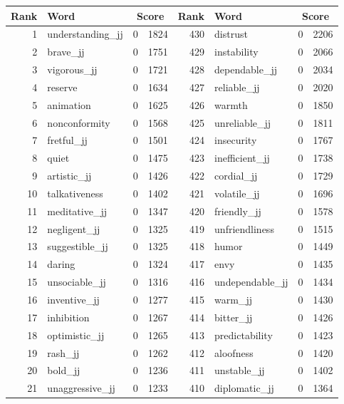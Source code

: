 \begin{table}[tbp]
    \begin{tabular}{| rlr@{.}l | rlr@{.}l |}
    \hline
    \textbf{Rank} & \textbf{Word} & \multicolumn{2}{c|}{\textbf{Score}} & \textbf{Rank} & \textbf{Word} & \multicolumn{2}{c|}{\textbf{Score}} \\
    \hline
    1 & understanding\_jj & 0 & 1824    &    430 & distrust & 0 & 2206 \\
    2 & brave\_jj & 0 & 1751    &    429 & instability & 0 & 2066 \\
    3 & vigorous\_jj & 0 & 1721    &    428 & dependable\_jj & 0 & 2034 \\
    4 & reserve & 0 & 1634    &    427 & reliable\_jj & 0 & 2020 \\
    5 & animation & 0 & 1625    &    426 & warmth & 0 & 1850 \\
    6 & nonconformity & 0 & 1568    &    425 & unreliable\_jj & 0 & 1811 \\
    7 & fretful\_jj & 0 & 1501    &    424 & insecurity & 0 & 1767 \\
    8 & quiet & 0 & 1475    &    423 & inefficient\_jj & 0 & 1738 \\
    9 & artistic\_jj & 0 & 1426    &    422 & cordial\_jj & 0 & 1729 \\
    10 & talkativeness & 0 & 1402    &    421 & volatile\_jj & 0 & 1696 \\
    11 & meditative\_jj & 0 & 1347    &    420 & friendly\_jj & 0 & 1578 \\
    12 & negligent\_jj & 0 & 1325    &    419 & unfriendliness & 0 & 1515 \\
    13 & suggestible\_jj & 0 & 1325    &    418 & humor & 0 & 1449 \\
    14 & daring & 0 & 1324    &    417 & envy & 0 & 1435 \\
    15 & unsociable\_jj & 0 & 1316    &    416 & undependable\_jj & 0 & 1434 \\
    16 & inventive\_jj & 0 & 1277    &    415 & warm\_jj & 0 & 1430 \\
    17 & inhibition & 0 & 1267    &    414 & bitter\_jj & 0 & 1426 \\
    18 & optimistic\_jj & 0 & 1265    &    413 & predictability & 0 & 1423 \\
    19 & rash\_jj & 0 & 1262    &    412 & aloofness & 0 & 1420 \\
    20 & bold\_jj & 0 & 1236    &    411 & unstable\_jj & 0 & 1402 \\
    21 & unaggressive\_jj & 0 & 1233    &    410 & diplomatic\_jj & 0 & 1364 \\

\end{tabular}
\end{table}
